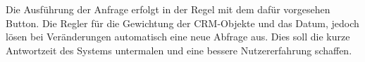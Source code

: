Die Ausführung der Anfrage erfolgt in der Regel mit dem dafür vorgesehen Button. Die Regler für die Gewichtung der CRM-Objekte und das Datum, jedoch lösen bei Veränderungen automatisch eine neue Abfrage aus. Dies soll die kurze Antwortzeit des Systems untermalen und eine bessere Nutzererfahrung schaffen.

